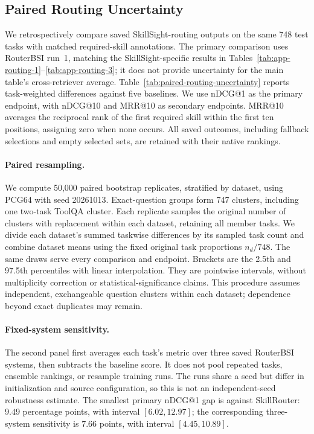 \subsection{Paired Routing Uncertainty}
\label{app:paired-routing}
We retrospectively compare saved SkillSight-routing outputs on the same 748 test tasks with matched required-skill annotations. The primary comparison uses RouterBSI run~1, matching the SkillSight-specific results in Tables~\ref{tab:app-routing-1}--\ref{tab:app-routing-3}; it does not provide uncertainty for the main table's cross-retriever average. Table~\ref{tab:paired-routing-uncertainty} reports task-weighted differences against five baselines. We use nDCG@1 as the primary endpoint, with nDCG@10 and MRR@10 as secondary endpoints. MRR@10 averages the reciprocal rank of the first required skill within the first ten positions, assigning zero when none occurs. All saved outcomes, including fallback selections and empty selected sets, are retained with their native rankings.

\paragraph{Paired resampling.}
We compute 50,000 paired bootstrap replicates, stratified by dataset, using PCG64 with seed 20261013. Exact-question groups form 747 clusters, including one two-task ToolQA cluster. Each replicate samples the original number of clusters with replacement within each dataset, retaining all member tasks. We divide each dataset's summed taskwise differences by its sampled task count and combine dataset means using the fixed original task proportions $n_d/748$. The same draws serve every comparison and endpoint. Brackets are the 2.5th and 97.5th percentiles with linear interpolation. They are pointwise intervals, without multiplicity correction or statistical-significance claims. This procedure assumes independent, exchangeable question clusters within each dataset; dependence beyond exact duplicates may remain.

\paragraph{Fixed-system sensitivity.}
The second panel first averages each task's metric over three saved RouterBSI systems, then subtracts the baseline score. It does not pool repeated tasks, ensemble rankings, or resample training runs. The runs share a seed but differ in initialization and source configuration, so this is not an independent-seed robustness estimate. The smallest primary nDCG@1 gap is against SkillRouter: $9.49$ percentage points, with interval $[6.02,12.97]$; the corresponding three-system sensitivity is $7.66$ points, with interval $[4.45,10.89]$.

